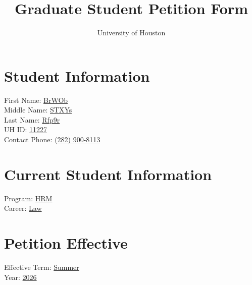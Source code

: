 \documentclass[a4paper,12pt]{article}
\title{Graduate Student Petition Form}
\author{University of Houston}
\date{}
\begin{document}
    
    \maketitle
    
    \section*{Student Information}
    \begin{tabbing}
    First Name: \hspace{3cm} \= \underline{\hspace{5cm} BrWOb} \\
    Middle Name: \> \underline{\hspace{5cm} STXYs} \\
    Last Name: \> \underline{\hspace{5cm} Rfp9r} \\
    UH ID: \> \underline{\hspace{5cm} 11227} \\
    Contact Phone: \> \underline{\hspace{5cm} (282) 900-8113} \\
    \end{tabbing}
    
    \section*{Current Student Information}
    \begin{tabbing}
    Program: \hspace{3cm} \= \underline{\hspace{5cm} HRM} \\
    Career: \> \underline{\hspace{5cm} Law} \\
    \end{tabbing}
    
    \section*{Petition Effective}
    \begin{tabbing}
    Effective Term: \hspace{2cm} \= \underline{\hspace{5cm} Summer} \\
    Year: \> \underline{\hspace{5cm} 2026} \\
    \end{tabbing}
    
\end{document}
